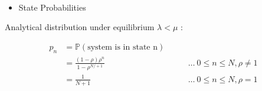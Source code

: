 \documentclass[11pt]{article}
\providecommand{\tightlist}{%
      \setlength{\itemsep}{0pt}\setlength{\parskip}{0pt}}
\begin{document}
    \begin{center}
    \end{center}
    { \hspace*{\fill} \\}
    
    \begin{itemize}
\tightlist
\item
  State Probabilities
\end{itemize}

Analytical distribution under equilibrium \(\lambda < \mu\) :

\begin{align}
    p_n &= \mathbb{P}(\text{system is in state n})\\
        &=  \frac{(1 - \rho) \rho ^ n}{1 - \rho ^{N /+ 1}}\ &&\quad\ \ldots\ 0 \leq n \leq N, \rho \neq 1\\
        &=  \frac{1}{N + 1}\ &&\quad\ \ldots\ 0 \leq n \leq N, \rho = 1\\
\end{align}
\end{document}
